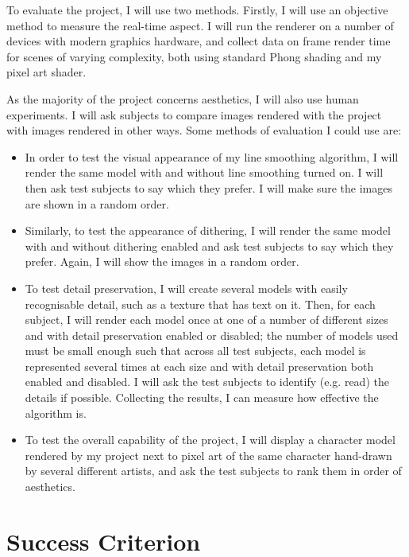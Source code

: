 \documentclass[12pt]{article}
\begin{document}
To evaluate the project, I will use two methods. Firstly, I will use an objective method to measure the real-time aspect. I will run the renderer on a number of devices with modern graphics hardware, and collect data on frame render time for scenes of varying complexity, both using standard Phong shading and my pixel art shader.

As the majority of the project concerns aesthetics, I will also use human experiments. I will ask subjects to compare images rendered with the project with images rendered in other ways. Some methods of evaluation I could use are:

\begin{itemize}

\item In order to test the visual appearance of my line smoothing algorithm, I will render the same model with and without line smoothing turned on. I will then ask test subjects to say which they prefer. I will make sure the images are shown in a random order.

\item Similarly, to test the appearance of dithering, I will render the same model with and without dithering enabled and ask test subjects to say which they prefer. Again, I will show the images in a random order.

\item To test detail preservation, I will create several models with easily recognisable detail, such as a texture that has text on it. Then, for each subject, I will render each model once at one of a number of different sizes and with detail preservation enabled or disabled; the number of models used must be small enough such that across all test subjects, each model is represented several times at each size and with detail preservation both enabled and disabled. I will ask the test subjects to identify (e.g. read) the details if possible. Collecting the results, I can measure how effective the algorithm is.

\item To test the overall capability of the project, I will display a character model rendered by my project next to pixel art of the same character hand-drawn by several different artists, and ask the test subjects to rank them in order of aesthetics.

\end{itemize}

\section*{Success Criterion}
\end{document}
